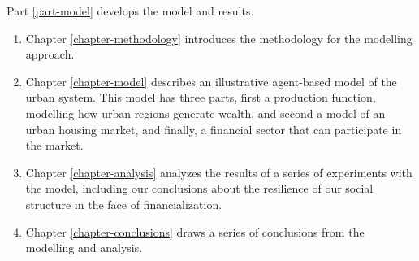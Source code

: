 Part \ref{part-model} develops the model and results.
\begin{enumerate}
    \item Chapter \ref{chapter-methodology} introduces the methodology for the modelling approach. %
    \item Chapter \ref{chapter-model} describes an illustrative agent-based model of the urban system. 
    This model has three  parts, first a production function, modelling how urban regions generate wealth, and second a model of an urban housing market, and finally, a financial sector that can participate in the market. 
    \item Chapter \ref{chapter-analysis} analyzes the results of a series of experiments with the model, including our conclusions about the resilience of our social structure in the face of financialization.
    \item Chapter \ref{chapter-conclusions} draws a series of conclusions from the modelling and analysis.
\end{enumerate}